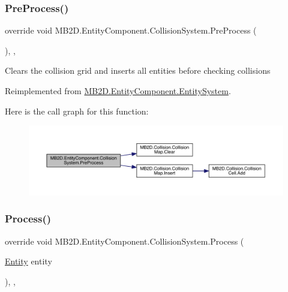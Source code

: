 \subsubsection{\texorpdfstring{Pre\+Process()}{PreProcess()}}
{\footnotesize\ttfamily override void M\+B2\+D.\+Entity\+Component.\+Collision\+System.\+Pre\+Process (\begin{DoxyParamCaption}{ }\end{DoxyParamCaption})\hspace{0.3cm}{\ttfamily [inline]}, {\ttfamily [protected]}, {\ttfamily [virtual]}}



Clears the collision grid and inserts all entities before checking collisions 



Reimplemented from \hyperlink{class_m_b2_d_1_1_entity_component_1_1_entity_system_aadc002dd04d9cb75775ca955a28e303e}{M\+B2\+D.\+Entity\+Component.\+Entity\+System}.

Here is the call graph for this function\+:
\nopagebreak
\begin{figure}[H]
\begin{center}
\leavevmode
\includegraphics[width=350pt]{class_m_b2_d_1_1_entity_component_1_1_collision_system_ad591227767c8b6c66ca3891de04e9050_cgraph}
\end{center}
\end{figure}
\hypertarget{class_m_b2_d_1_1_entity_component_1_1_collision_system_adfbee070ed7b120565a5f8a08c159535}{}\label{class_m_b2_d_1_1_entity_component_1_1_collision_system_adfbee070ed7b120565a5f8a08c159535} 
\subsubsection{\texorpdfstring{Process()}{Process()}}
{\footnotesize\ttfamily override void M\+B2\+D.\+Entity\+Component.\+Collision\+System.\+Process (\begin{DoxyParamCaption}\item[{\hyperlink{class_m_b2_d_1_1_entity_component_1_1_entity}{Entity}}]{entity }\end{DoxyParamCaption})\hspace{0.3cm}{\ttfamily [inline]}, {\ttfamily [protected]}, {\ttfamily [virtual]}}



